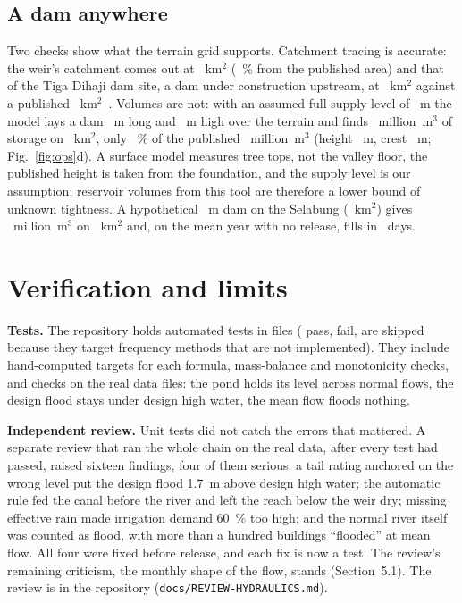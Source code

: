 \documentclass[10pt,a4paper,twocolumn]{extarticle}
\newcommand{\kmsq}{km$^2$}
\newcommand{\Mm}{million~m$^3$}
\begin{document}
\subsection{A dam anywhere}

Two checks show what the terrain grid supports. Catchment tracing is accurate: the weir's catchment comes out at
\CatchGrid~\kmsq{} (\CatchGridErrPct~\% from the published area) and that of the Tiga Dihaji dam site, a dam under
construction upstream, at \TDCatch~\kmsq{} against a published \TDCatchPub~\kmsq~\citep{kurniasari2022}. Volumes are
not: with an assumed full supply level of \TDCrest~m the model lays a dam \TDLen~m long and \TDHeight~m high over the
terrain and finds \TDVol~\Mm{} of storage on \TDArea~\kmsq, only \TDVolPct~\% of the published \TDVolPub~\Mm{}
(height \TDHeightPub~m, crest \TDLenPub~m; Fig.~\ref{fig:ops}d). A surface model measures tree tops, not the valley
floor, the published height is taken from the foundation, and the supply level is our assumption; reservoir volumes
from this tool are therefore a lower bound of unknown tightness. A hypothetical \SelHeight~m dam on the Selabung
(\SelCatch~\kmsq) gives \SelVol~\Mm{} on \SelArea~\kmsq{} and, on the mean year with no release, fills in
\SelFillDays~days.

\section{Verification and limits}

\textbf{Tests.} The repository holds \NTests{} automated tests in \NTestFiles{} files (\NPass{} pass, \NFail{} fail,
\NSkip{} are skipped because they target frequency methods that are not implemented). They include hand-computed
targets for each formula, mass-balance and monotonicity checks, and checks on the real data files: the pond holds
its level across normal flows, the design flood stays under design high water, the mean flow floods nothing.

\textbf{Independent review.} Unit tests did not catch the errors that mattered. A separate review that ran the
whole chain on the real data, after every test had passed, raised sixteen findings, four of them serious: a tail
rating anchored on the wrong level put the design flood 1.7~m above design high water; the automatic rule fed the
canal before the river and left the reach below the weir dry; missing effective rain made irrigation demand 60~\%
too high; and the normal river itself was counted as flood, with more than a hundred buildings ``flooded'' at mean
flow. All four were fixed before release, and each fix is now a test. The review's remaining criticism, the monthly
shape of the flow, stands (Section~5.1). The review is in the repository (\texttt{docs/REVIEW-HYDRAULICS.md}).
\end{document}

